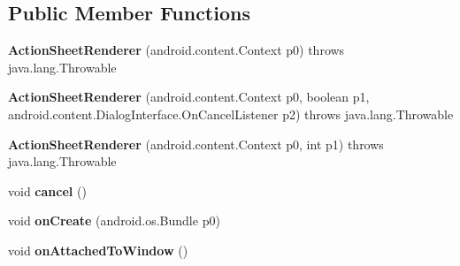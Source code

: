\subsection*{Public Member Functions}
\begin{DoxyCompactItemize}
\item 
\hypertarget{classmd5282f1122c1313907b9bf274dd2c2f344_1_1ActionSheetRenderer_a89dc322bfe6a0834c2ecb5b5cbdf187e}{}{\bfseries Action\+Sheet\+Renderer} (android.\+content.\+Context p0)  throws java.\+lang.\+Throwable 	\label{classmd5282f1122c1313907b9bf274dd2c2f344_1_1ActionSheetRenderer_a89dc322bfe6a0834c2ecb5b5cbdf187e}

\item 
\hypertarget{classmd5282f1122c1313907b9bf274dd2c2f344_1_1ActionSheetRenderer_a2f683c37f22513e33e4c63e76d61184c}{}{\bfseries Action\+Sheet\+Renderer} (android.\+content.\+Context p0, boolean p1, android.\+content.\+Dialog\+Interface.\+On\+Cancel\+Listener p2)  throws java.\+lang.\+Throwable 	\label{classmd5282f1122c1313907b9bf274dd2c2f344_1_1ActionSheetRenderer_a2f683c37f22513e33e4c63e76d61184c}

\item 
\hypertarget{classmd5282f1122c1313907b9bf274dd2c2f344_1_1ActionSheetRenderer_a9a92fc218c35a3f9f3769c95a7a8d547}{}{\bfseries Action\+Sheet\+Renderer} (android.\+content.\+Context p0, int p1)  throws java.\+lang.\+Throwable 	\label{classmd5282f1122c1313907b9bf274dd2c2f344_1_1ActionSheetRenderer_a9a92fc218c35a3f9f3769c95a7a8d547}

\item 
\hypertarget{classmd5282f1122c1313907b9bf274dd2c2f344_1_1ActionSheetRenderer_a401fe081d079f6f1335ee7d81cd58c57}{}void {\bfseries cancel} ()\label{classmd5282f1122c1313907b9bf274dd2c2f344_1_1ActionSheetRenderer_a401fe081d079f6f1335ee7d81cd58c57}

\item 
\hypertarget{classmd5282f1122c1313907b9bf274dd2c2f344_1_1ActionSheetRenderer_a5622750b59d8f84e755d08644cab4374}{}void {\bfseries on\+Create} (android.\+os.\+Bundle p0)\label{classmd5282f1122c1313907b9bf274dd2c2f344_1_1ActionSheetRenderer_a5622750b59d8f84e755d08644cab4374}

\item 
\hypertarget{classmd5282f1122c1313907b9bf274dd2c2f344_1_1ActionSheetRenderer_adcaf61e0a44432858d2a60ae28ae647e}{}void {\bfseries on\+Attached\+To\+Window} ()\label{classmd5282f1122c1313907b9bf274dd2c2f344_1_1ActionSheetRenderer_adcaf61e0a44432858d2a60ae28ae647e}


\end{DoxyCompactItemize}
